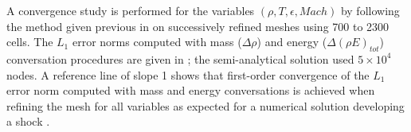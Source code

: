 \documentclass[times,doublespace]{fldauth}%
\begin{document}
A convergence study is performed for the variables $(\rho, T, \epsilon, Mach)$ by following the method given previous in  on successively refined meshes using 700 to 2300 cells. The $L_1$ error norms computed with mass ($\Delta \rho$) and energy ($\Delta (\rho E)_{tot}$) conversation procedures are given in ; the semi-analytical solution used $5 \times 10^4$ nodes. A reference line of slope 1 shows that first-order convergence of the $L_1$ error norm computed with mass and energy conversations is achieved when refining the mesh for all variables as expected for a numerical solution developing a shock \cite{lowrie-2009}. 
%
\end{document}
